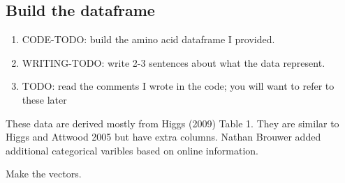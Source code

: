 \documentclass[
]{book}
\providecommand{\tightlist}{%
  \setlength{\itemsep}{0pt}\setlength{\parskip}{0pt}}
\begin{document}
\hypertarget{build-the-dataframe-1}{%
\subsection{Build the dataframe}\label{build-the-dataframe-1}}

\begin{enumerate}
\def\labelenumi{\arabic{enumi}.}
\tightlist
\item
  CODE-TODO: build the amino acid dataframe I provided.
\item
  WRITING-TODO: write 2-3 sentences about what the data represent.
\item
  TODO: read the comments I wrote in the code; you will want to refer to these later
\end{enumerate}

These data are derived mostly from Higgs (2009) Table 1. They are similar to Higgs and Attwood 2005 but have extra columns. Nathan Brouwer added additional categorical varibles based on online information.

Make the vectors.
\end{document}
